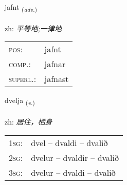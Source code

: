 \documentclass[frontgrid, backgrid]{flacards}\usepackage[]{graphicx}\usepackage[]{color}
\begin{document}
\renewcommand{\flhead}{\vskip5pt \fboxsep=0pt {\small\bfseries\footnotesize Atviksorð | 副词}}
\renewcommand{\fcfoot}{\vskip5pt \fboxsep=0pt \hspace{2pt}{\small\bfseries\footnotesize 2K}}

\renewcommand{\blhead}{\vskip5pt {\small\bfseries\footnotesize Atviksorð | 副词 }}
\renewcommand{\bcfoot}{\vskip5pt \hspace{2pt}{\small\bfseries\footnotesize 2K}}


{jafnt \small{\textsubscript{(\textit{adv.})}} \\[1ex] %
\textphonetic{[jam̥t]} \\
zh: \emph{平等地;一律地} \\  [2ex]
\renewcommand*{\arraystretch}{0.8}
\begin{tabular}{ll}
\textsc{pos}: & jafnt \\ 
\textsc{comp.}: & jafnar \\ 
\textsc{superl.}: & jafnast \\
\end{tabular}
}

\renewcommand{\flhead}{\vskip5pt \fboxsep=0pt {\small\bfseries\footnotesize Sagnorð | 动词}}
\renewcommand{\fcfoot}{\vskip5pt \fboxsep=0pt \hspace{2pt}{\small\bfseries\footnotesize 2K}}

\renewcommand{\blhead}{\vskip5pt {\small\bfseries\footnotesize Sagnorð | 动词 }}
\renewcommand{\bcfoot}{\vskip5pt \hspace{2pt}{\small\bfseries\footnotesize 2K}}


{dvelja \small{\textsubscript{(\textit{v.})}} \\[1ex] %
\textphonetic{[tvɛlja]} \\
zh: \emph{居住，栖身} \\  [2ex]
\renewcommand*{\arraystretch}{0.8}
\begin{tabular}{p{1cm}l}
\textsc{1sg}: & dvel -- dvaldi -- dvalið \\ 
\textsc{2sg}: & dvelur -- dvaldir -- dvalið \\ 
\textsc{3sg}: & dvelur -- dvaldi -- dvalið \\ 
\end{tabular}
}
\end{document}
